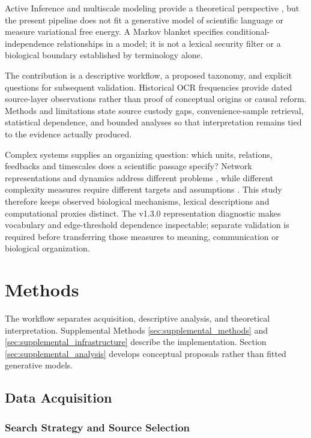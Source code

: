 \documentclass[
]{article}
\numberwithin{equation}{section}
\begin{document}
Active Inference and multiscale modeling provide a theoretical
perspective \citep{friston2010free, friedman2021active}, but the present
pipeline does not fit a generative model of scientific language or
measure variational free energy. A Markov blanket specifies
conditional-independence relationships in a model; it is not a lexical
security filter or a biological boundary established by terminology
alone.

The contribution is a descriptive workflow, a proposed taxonomy, and
explicit questions for subsequent validation. Historical OCR frequencies
provide dated source-layer observations rather than proof of conceptual
origins or causal reform. Methods and limitations state source custody
gaps, convenience-sample retrieval, statistical dependence, and bounded
analyses so that interpretation remains tied to the evidence actually
produced.

Complex systems supplies an organizing question: which units, relations,
feedbacks and timescales does a scientific passage specify? Network
representations and dynamics address different problems
\citep{newman2003structure}, while different complexity measures require
different targets and assumptions \citep{ladyman2013complex}. This study
therefore keeps observed biological mechanisms, lexical descriptions and
computational proxies distinct. The v1.3.0 representation diagnostic
makes vocabulary and edge-threshold dependence inspectable; separate
validation is required before transferring those measures to meaning,
communication or biological organization.

\clearpage

\section{Methods}\label{sec:methodology}

The workflow separates acquisition, descriptive analysis, and
theoretical interpretation. Supplemental Methods
\ref{sec:supplemental_methods} and \ref{sec:supplemental_infrastructure}
describe the implementation. Section \ref{sec:supplemental_analysis}
develops conceptual proposals rather than fitted generative models.

\subsection{Data Acquisition}\label{sec:data_acquisition}

\subsubsection{Search Strategy and Source
Selection}\label{search-strategy-and-source-selection}
\end{document}
